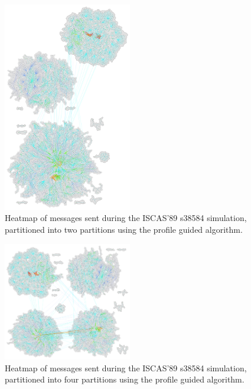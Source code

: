 \documentclass[11pt]{book}
\begin{document}
\begin{figure}
\centering
\includegraphics[clip=true,width=0.5\textwidth]{figs/s38584_2part.pdf}
\caption{Heatmap of messages sent during the ISCAS'89 s38584 simulation, partitioned into two partitions using the profile guided algorithm.}
\end{figure}

\begin{figure}
\centering
\includegraphics[clip=true,width=0.5\textwidth]{figs/s38584_4part.pdf}
\caption{Heatmap of messages sent during the ISCAS'89 s38584 simulation, partitioned into four partitions using the profile guided algorithm.}
\end{figure}
\end{document}
